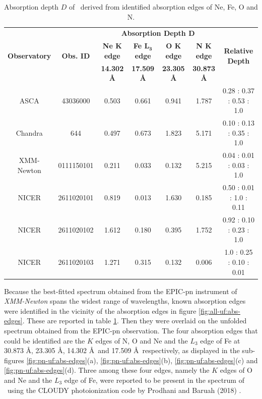     \begin{table}[!htb]
    	\centering
    	\caption{Absorption depth $D$ of \source\ derived from identified absorption edges of Ne, Fe, O and N.}
    	\label{tab:abs-depth}
		\begin{tabular}{ccccccc}
			\hline
			\multirow{3}{*}{\textbf{Observatory}} & \multirow{3}{*}{\textbf{Obs. ID}} & \multicolumn{4}{c}{\textbf{Absorption Depth $\boldsymbol{D}$}} & \multirow{3}{*}{\textbf{Relative Depth}} \\ \cline{3-6} & & \textbf{Ne $\boldsymbol{K}$ edge} & \textbf{Fe $\boldsymbol{L_3}$ edge} & \textbf{O $\boldsymbol{K}$ edge} & \textbf{N $\boldsymbol{K}$ edge} \\ \cline{3-6} & & \textbf{14.302 \AA} & \textbf{17.509 \AA} & \textbf{23.305 \AA} & \textbf{30.873 \AA} \\
			\hline
			{ASCA} & {43036000} & {0.503} & {0.661} & {0.941} & {1.787} & {0.28 : 0.37 : 0.53 : 1.0} \\ %
			{Chandra} & {644} & {0.497} & {0.673} & {1.823} & {5.171} & {0.10 : 0.13 : 0.35 : 1.0} \\ %
			{XMM-Newton} & {0111150101} & {0.211} & {0.033} & {0.132} & {5.215} & {0.04 : 0.01 : 0.03 : 1.0} \\ %
			{NICER} & {2611020101} & {0.819} & {0.013} & {1.630} & {0.185} & {0.50 : 0.01 : 1.0 : 0.11} \\ %
			{NICER} & {2611020102} & {1.612} & {0.180} & {0.395} & {1.752} & {0.92 : 0.10 : 0.23 : 1.0} \\ %
			{NICER} & {2611020103} & {1.271} & {0.315} & {0.132} & {0.006} & {1.0 : 0.25 : 0.10 : 0.01} \\ %
			\hline
		\end{tabular}
	\end{table}

    Because the best-fitted spectrum obtained from the EPIC-pn instrument of \textit{XMM-Newton} spans the widest range of wavelengths, known absorption edges \cite{bearden1967reevaluation,juett2006high} were identified in the vicinity of the absorption edges in figure \ref{fig:all-uf:abs-edges}. These are reported in table \ref{tab:abs-depth}. Then they were overlaid on the unfolded spectrum obtained from the EPIC-pn observation. The four absorption edges that could be identified are the $K$ edges of N, O and Ne and the $L_3$ edge of Fe at 30.873 \AA, 23.305 \AA, 14.302 \AA\ and 17.509 \AA\ respectively, as displayed in the sub-figures \ref{fig:pn-uf:abs-edges}(a), \ref{fig:pn-uf:abs-edges}(b), \ref{fig:pn-uf:abs-edges}(c) and \ref{fig:pn-uf:abs-edges}(d). Three among these four edges, namely the $K$ edges of O and Ne and the $L_3$ edge of Fe, were reported to be present in the spectrum of \source\ using the CLOUDY photoionization code by Prodhani and Baruah (2018) \cite{prodhani2018galactic}.
    

